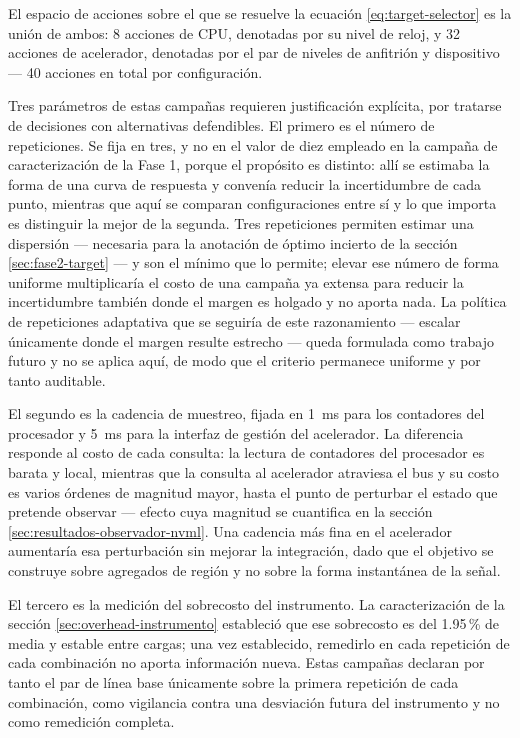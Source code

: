 \documentclass[12pt,oneside,spanish]{book}
\begin{document}
El espacio de acciones sobre el que se resuelve la ecuación \eqref{eq:target-selector} es la unión de ambos: 8 acciones de CPU, denotadas por su nivel de reloj, y 32 acciones de acelerador, denotadas por el par de niveles de anfitrión y dispositivo --- 40 acciones en total por configuración.

Tres parámetros de estas campañas requieren justificación explícita, por tratarse de decisiones con alternativas defendibles. El primero es el número de repeticiones. Se fija en tres, y no en el valor de diez empleado en la campaña de caracterización de la Fase 1, porque el propósito es distinto: allí se estimaba la forma de una curva de respuesta y convenía reducir la incertidumbre de cada punto, mientras que aquí se comparan configuraciones entre sí y lo que importa es distinguir la mejor de la segunda. Tres repeticiones permiten estimar una dispersión --- necesaria para la anotación de óptimo incierto de la sección \ref{sec:fase2-target} --- y son el mínimo que lo permite; elevar ese número de forma uniforme multiplicaría el costo de una campaña ya extensa para reducir la incertidumbre también donde el margen es holgado y no aporta nada. La política de repeticiones adaptativa que se seguiría de este razonamiento --- escalar únicamente donde el margen resulte estrecho --- queda formulada como trabajo futuro y no se aplica aquí, de modo que el criterio permanece uniforme y por tanto auditable.

El segundo es la cadencia de muestreo, fijada en 1~ms para los contadores del procesador y 5~ms para la interfaz de gestión del acelerador. La diferencia responde al costo de cada consulta: la lectura de contadores del procesador es barata y local, mientras que la consulta al acelerador atraviesa el bus y su costo es varios órdenes de magnitud mayor, hasta el punto de perturbar el estado que pretende observar --- efecto cuya magnitud se cuantifica en la sección \ref{sec:resultados-observador-nvml}. Una cadencia más fina en el acelerador aumentaría esa perturbación sin mejorar la integración, dado que el objetivo se construye sobre agregados de región y no sobre la forma instantánea de la señal.

El tercero es la medición del sobrecosto del instrumento. La caracterización de la sección \ref{sec:overhead-instrumento} estableció que ese sobrecosto es del 1.95\,\% de media y estable entre cargas; una vez establecido, remedirlo en cada repetición de cada combinación no aporta información nueva. Estas campañas declaran por tanto el par de línea base únicamente sobre la primera repetición de cada combinación, como vigilancia contra una desviación futura del instrumento y no como remedición completa.
\end{document}
